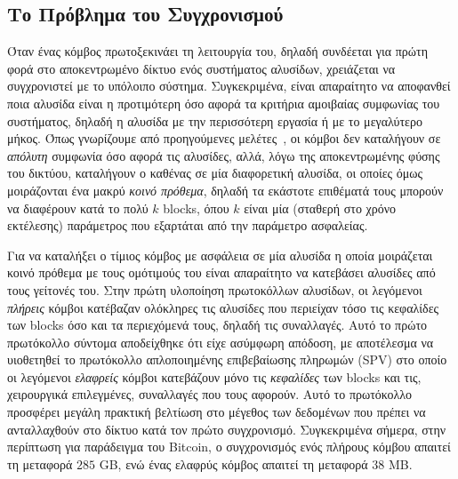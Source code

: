 \subsection*{Το Πρόβλημα του Συγχρονισμού}

Όταν ένας κόμβος πρωτοξεκινάει τη λειτουργία του, δηλαδή συνδέεται για πρώτη φορά στο αποκεντρωμένο
δίκτυο ενός συστήματος αλυσίδων, χρειάζεται να συγχρονιστεί με το υπόλοιπο σύστημα. Συγκεκριμένα,
είναι απαραίτητο να αποφανθεί ποια αλυσίδα είναι η προτιμότερη όσο αφορά τα κριτήρια αμοιβαίας
συμφωνίας του συστήματος, δηλαδή η αλυσίδα με την περισσότερη εργασία
ή με το μεγαλύτερο μήκος. Όπως γνωρίζουμε από προηγούμενες
μελέτες~\cite{backbone}, οι κόμβοι δεν καταλήγουν σε \emph{απόλυτη} συμφωνία όσο αφορά τις αλυσίδες,
αλλά, λόγω της αποκεντρωμένης φύσης του δικτύου, καταλήγουν ο καθένας σε μία διαφορετική αλυσίδα,
οι οποίες όμως μοιράζονται ένα μακρύ \emph{κοινό πρόθεμα}, δηλαδή τα εκάστοτε επιθέματά τους μπορούν
να διαφέρουν κατά το πολύ $k$ blocks, όπου $k$ είναι μία (σταθερή στο χρόνο εκτέλεσης) παράμετρος που
εξαρτάται από την παράμετρο ασφαλείας.

Για να καταλήξει ο τίμιος κόμβος με ασφάλεια σε μία αλυσίδα η οποία μοιράζεται κοινό πρόθεμα με τους
ομότιμούς του είναι απαραίτητο να κατεβάσει αλυσίδες από τους γείτονές του. Στην
πρώτη υλοποίηση πρωτοκόλλων αλυσίδων, οι λεγόμενοι \emph{πλήρεις} κόμβοι κατέβαζαν ολόκληρες τις
αλυσίδες που περιείχαν τόσο
τις κεφαλίδες των blocks όσο και τα περιεχόμενά τους, δηλαδή τις συναλλαγές. Αυτό το πρώτο πρωτόκολλο
σύντομα αποδείχθηκε ότι είχε ασύμφωρη απόδοση, με αποτέλεσμα να υιοθετηθεί το πρωτόκολλο απλοποιημένης
επιβεβαίωσης πληρωμών (SPV) στο οποίο οι λεγόμενοι \emph{ελαφρείς} κόμβοι κατεβάζουν μόνο τις \emph{κεφαλίδες}
των blocks και τις, χειρουργικά επιλεγμένες, συναλλαγές που τους αφορούν. Αυτό το πρωτόκολλο προσφέρει
μεγάλη πρακτική βελτίωση στο μέγεθος των δεδομένων που πρέπει να ανταλλαχθούν στο δίκτυο κατά τον
πρώτο συγχρονισμό. Συγκεκριμένα σήμερα, στην περίπτωση για παράδειγμα του Bitcoin, ο
συγχρονισμός ενός πλήρους κόμβου απαιτεί τη μεταφορά $285$ GB, ενώ ένας ελαφρύς κόμβος
απαιτεί τη μεταφορά $38$ MB.

